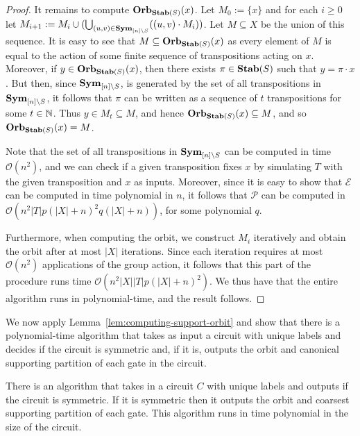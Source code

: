 \documentclass[../paper.tex]{subfiles}
\begin{document}
\begin{proof}
  It remains to compute $\text{\textbf{Orb}}_{\text{\textbf{Stab}}(S)}(x)$. Let $M_0 := \{x\}$ and for each $i
  \geq 0$ let $M_{i+1} := M_i\cup (\bigcup_{(u,v) \in \text{\textbf{Sym}}_{[n] \setminus S}}
  ((u,v) \cdot M_i))$. Let $M \subseteq X$ be the union of this sequence. It is
  easy to see that $M \subseteq \text{\textbf{Orb}}_{\text{\textbf{Stab}}(S)}(x)$ as every element of $M$ is
  equal to the action of some finite sequence of transpositions acting on $x$.
  Moreover, if $y \in \text{\textbf{Orb}}_{\text{\textbf{Stab}}(S)}(x)$, then there exists $\pi \in \text{\textbf{Stab}}(S)$
  such that $y = \pi \cdot x$. But then, since $\text{\textbf{Sym}}_{[n] \setminus S}$, is
  generated by the set of all transpositions in $\text{\textbf{Sym}}_{[n] \setminus S}$, it
  follows that $\pi$ can be written as a sequence of $t$ transpositions for some
  $t \in \mathbb{N}$. Thus $y \in M_t \subseteq M$, and hence $\text{\textbf{Orb}}_{\text{\textbf{Stab}}(S)}(x)
  \subseteq M$, and so $\text{\textbf{Orb}}_{\text{\textbf{Stab}}(S)}(x) = M$.

  Note that the set of all transpositions in $\text{\textbf{Sym}}_{[n] \setminus S}$ can be
  computed in time $\mathcal{O}(n^{2})$, and we can check if a given
  transposition fixes $x$ by simulating $T$ with the given transposition and $x$
  as inputs. Moreover, since it is easy to show that $\mathcal{E}$ can be
  computed in time polynomial in $n$, it follows that $\mathcal{P}$ can be
  computed in $\mathcal{O} (n^2 \vert T \vert p(\vert X \vert +n)^2 q(\vert X
  \vert + n))$, for some polynomial $q$.

  Furthermore, when computing the orbit, we construct $M_i$ iteratively and
  obtain the orbit after at most $\vert X \vert$ iterations. Since each
  iteration requires at most $\mathcal{O} (n^{2})$ applications of the group
  action, it follows that this part of the procedure runs time
  $\mathcal{O}(n^2\vert X \vert \vert T \vert p (\vert X \vert + n)^2)$. We thus
  have that the entire algorithm runs in polynomial-time, and the result
  follows.
\end{proof}

We now apply Lemma~\ref{lem:computing-support-orbit} and show that there is a
polynomial-time algorithm that takes as input a circuit with unique labels and
decides if the circuit is symmetric and, if it is, outputs the orbit and
canonical supporting partition of each gate in the circuit.

\begin{lem}
  There is an algorithm that takes in a circuit $C$ with unique labels and
  outputs if the circuit is symmetric. If it is symmetric then it outputs the
  orbit and coarsest supporting partition of each gate. This algorithm runs in
  time polynomial in the size of the circuit.
  \label{lem:computing-support-orbit-gate}
\end{lem}
\end{document}
